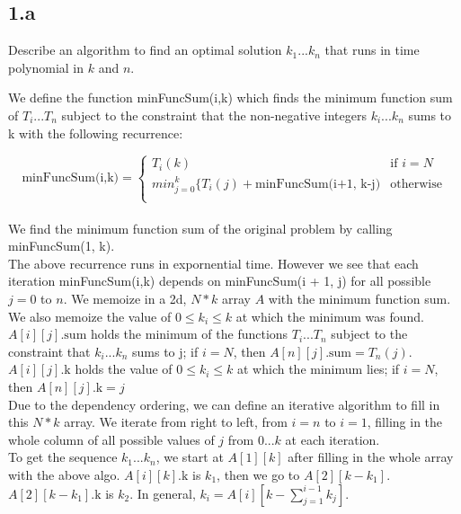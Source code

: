 \documentclass[11pt]{article}
\begin{document}





\subsection *{1.a} Describe an algorithm to find an optimal solution $k_1...k_n$ that runs in time polynomial in $k$ and $n$. 
\begin{solution}
We define the function minFuncSum(i,k) which finds the minimum function sum of $T_i... T_n$ subject to the constraint that the non-negative integers $k_i...k_n$ sums to k with the following recurrence: 

\[
	\text{minFuncSum(i,k)} = \begin{cases}
		T_i(k) & \text{if $i = N$} \\
		min_{j=0}^{k} \{T_i(j) + \text{minFuncSum(i+1, k-j)} & \text{otherwise} \\
	\end{cases}
\]
\\ 
We find the minimum function sum of the original problem by calling minFuncSum(1, k). \\

The above recurrence runs in expornential time. However we see that each iteration minFuncSum(i,k) depends on minFuncSum(i + 1, j) for all possible $j = 0 $ to $n$. We memoize in a 2d, $N*k$ array $A$ with the minimum function sum. We also memoize the value of $0 \leq k_i \leq k$ at which the minimum was found. \\ 

$A[i][j].\text{sum}$ holds the minimum of the functions $T_i...T_n$ subject to the constraint that $k_i...k_n$ sums to j; if $i = N$, then $A[n][j].\text{sum} = T_n(j)$. $A[i][j].\text{k}$ holds the value of $0 \leq k_i \leq k$ at which the minimum lies; if $i = N$, then $A[n][j].\text{k}=j$ \\

Due to the dependency ordering, we can define an iterative algorithm to fill in this $N*k$ array. We iterate from right to left, from $i=n$ to $i=1$, filling in the whole column of all possible values of $j$ from $0...k$ at each iteration. \\ 

To get the sequence $k_1...k_n$, we start at $A[1][k]$ after filling in the whole array with the above algo. $A[i][k].\text{k}$ is $k_1$, then we go to $A[2][k-k_1]$. $A[2][k-k_1].\text{k}$ is $k_2$. In general, $k_i= A[i][k-\sum_{j=1}^{i-1} k_j]$. \\ 


\end{solution}
\end{document}
